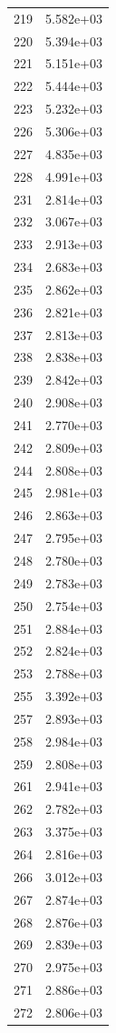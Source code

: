 \documentclass[12pt]{article}
\begin{document}
\begin{longtable}{@{}cc@{}}
219 & 5.582e+03 \\
220 & 5.394e+03 \\
221 & 5.151e+03 \\
222 & 5.444e+03 \\
223 & 5.232e+03 \\
226 & 5.306e+03 \\
227 & 4.835e+03 \\
228 & 4.991e+03 \\
231 & 2.814e+03 \\
232 & 3.067e+03 \\
233 & 2.913e+03 \\
234 & 2.683e+03 \\
235 & 2.862e+03 \\
236 & 2.821e+03 \\
237 & 2.813e+03 \\
238 & 2.838e+03 \\
239 & 2.842e+03 \\
240 & 2.908e+03 \\
241 & 2.770e+03 \\
242 & 2.809e+03 \\
244 & 2.808e+03 \\
245 & 2.981e+03 \\
246 & 2.863e+03 \\
247 & 2.795e+03 \\
248 & 2.780e+03 \\
249 & 2.783e+03 \\
250 & 2.754e+03 \\
251 & 2.884e+03 \\
252 & 2.824e+03 \\
253 & 2.788e+03 \\
255 & 3.392e+03 \\
257 & 2.893e+03 \\
258 & 2.984e+03 \\
259 & 2.808e+03 \\
261 & 2.941e+03 \\
262 & 2.782e+03 \\
263 & 3.375e+03 \\
264 & 2.816e+03 \\
266 & 3.012e+03 \\
267 & 2.874e+03 \\
268 & 2.876e+03 \\
269 & 2.839e+03 \\
270 & 2.975e+03 \\
271 & 2.886e+03 \\
272 & 2.806e+03 \\

\end{longtable}
\end{document}
